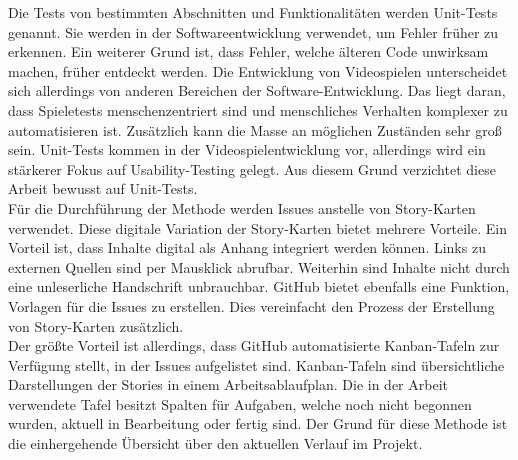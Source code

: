 Die Tests von bestimmten Abschnitten und Funktionalitäten werden Unit-Tests genannt\cite{unit-tests}.
Sie werden in der Softwareentwicklung verwendet, um Fehler früher zu erkennen.
Ein weiterer Grund ist, dass Fehler, welche älteren Code unwirksam machen, früher entdeckt werden.
Die Entwicklung von Videospielen unterscheidet sich allerdings von anderen Bereichen der Software-Entwicklung\cite{difference-development}.
Das liegt daran, dass Spieletests menschenzentriert sind und menschliches Verhalten komplexer zu automatisieren ist\cite{testing-game-dev}.
Zusätzlich kann die Masse an möglichen Zuständen sehr groß sein.
Unit-Tests kommen in der Videospielentwicklung vor, allerdings wird ein stärkerer Fokus auf Usability-Testing gelegt\cite{no-unit-tests}.
Aus diesem Grund verzichtet diese Arbeit bewusst auf Unit-Tests.\\

Für die Durchführung der Methode werden Issues\cite{github-issues} anstelle von Story-Karten verwendet.
Diese digitale Variation der Story-Karten bietet mehrere Vorteile.
Ein Vorteil ist, dass Inhalte digital als Anhang integriert werden können.
Links zu externen Quellen sind per Mausklick abrufbar.
Weiterhin sind Inhalte nicht durch eine unleserliche Handschrift unbrauchbar.
GitHub bietet ebenfalls eine Funktion, Vorlagen für die Issues zu erstellen.
Dies vereinfacht den Prozess der Erstellung von Story-Karten zusätzlich.\\

Der größte Vorteil ist allerdings, dass GitHub automatisierte Kanban-Tafeln zur Verfügung stellt, in der Issues aufgelistet sind\cite{github-kanban}.
Kanban-Tafeln sind übersichtliche Darstellungen der Stories in einem Arbeitsablaufplan\cite{kanban-oreilly}.
Die in der Arbeit verwendete Tafel besitzt Spalten für Aufgaben, welche noch nicht begonnen wurden, aktuell in Bearbeitung oder fertig sind.
Der Grund für diese Methode ist die einhergehende Übersicht über den aktuellen Verlauf im Projekt.
